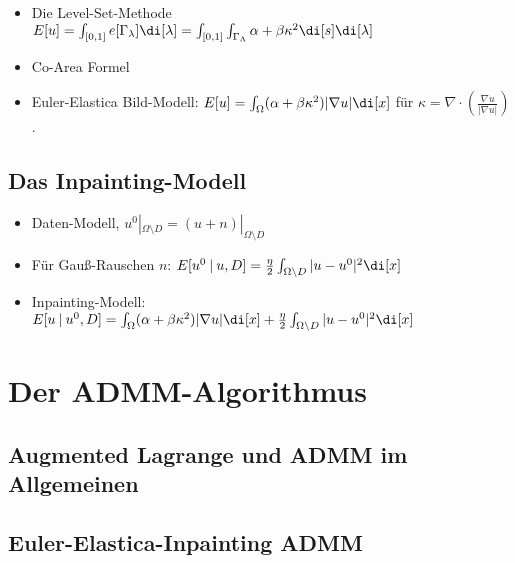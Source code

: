 \documentclass{mythesis}
\begin{document}
\begin{itemize}
    \item
	Die Level-Set-Methode
	\begin{math}
	    E[u] = \int_{[0,1]} e[\Gamma_\lambda] \di[\lambda]
	    = \int_{[0,1]} \int_{\Gamma_\Lambda} \alpha + \beta \kappa^2 \di[s] \di[\lambda]
	\end{math}
    \item
	Co-Area Formel
    \item
	Euler-Elastica Bild-Modell:
	\begin{math}
	    E[u] = \int_{\Omega} (\alpha + \beta \kappa^2) |\nabla u| \di[x]
	\end{math}
	für $\kappa = \nabla \cdot (\frac{\nabla u}{|\nabla u|})$.
\end{itemize}

\subsection{Das Inpainting-Modell}

\begin{itemize}
    \item
	Daten-Modell, $u^0|_{\Omega\setminus D} = (u + n)|_{\Omega\setminus D}$
    \item
	Für Gauß-Rauschen $n$:
	\begin{math}
	    E[u^0 \st u, D] = \frac{\eta}{2} \int_{\Omega \setminus D} |u - u^0|^2 \di[x]
	\end{math}
    \item
	Inpainting-Modell:
	\begin{math}
	    E[u \st u^0, D]
	    = \int_\Omega (\alpha + \beta \kappa^2) |\nabla u| \di[x] + \frac{\eta}{2} \int_{\Omega\setminus D} |u - u^0|^2 \di[x]
	\end{math}
\end{itemize}

\section{Der ADMM-Algorithmus}

\subsection{Augmented Lagrange und ADMM im Allgemeinen}

\subsection{Euler-Elastica-Inpainting ADMM}
\end{document}
